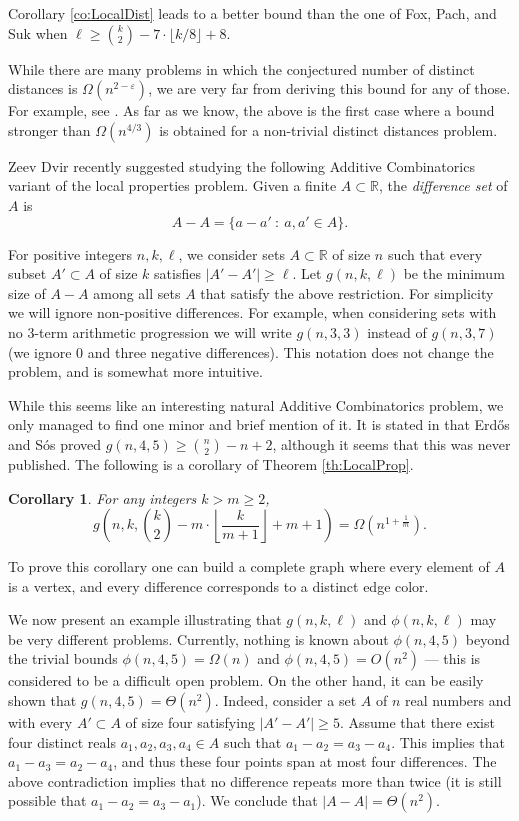 \documentclass[11pt]{article}
\newtheorem{corollary}[theorem]{Corollary}
\newcounter{problems}
\newcommand{\parag}[1]{\vspace{2mm}

\noindent{\bf #1} }
\newcommand{\RR}{\ensuremath{\mathbb R}}
\def\eps{{\varepsilon}}
\begin{document}
Corollary \ref{co:LocalDist} leads to a better bound than the one of Fox, Pach, and Suk \cite{FPS17} when $\ell \ge \binom{k}{2} - 7\cdot \lfloor k/8\rfloor + 8$.

While there are many problems in which the conjectured number of distinct distances is $\Omega(n^{2-\eps})$, we are very far from deriving this bound for any of those.
For example, see \cite{Sheffer14}.
As far as we know, the above is the first case where a bound stronger than $\Omega(n^{4/3})$ is obtained for a non-trivial distinct distances problem.

\parag{Difference sets with local properties.}
Zeev Dvir recently suggested studying the following Additive Combinatorics variant of the local properties problem.
Given a finite $A\subset \RR$, the \emph{difference set} of $A$ is
%
\[ A-A = \{a-a'\ :\ a,a'\in A \}. \]

For positive integers $n,k,\ell$, we consider sets $A\subset \RR$ of size $n$ such that every subset $A'\subset A$ of size $k$ satisfies $|A'-A'|\ge \ell$.
Let $g(n,k,\ell)$ be the minimum size of $A-A$ among all sets $A$ that satisfy the above restriction.
For simplicity we will ignore non-positive differences.
For example, when considering sets with no 3-term arithmetic progression we will write $g(n,3,3)$ instead of $g(n,3,7)$ (we ignore 0 and three negative differences).
This notation does not change the problem, and is somewhat more intuitive.

While this seems like an interesting natural Additive Combinatorics problem, we only managed to find one minor and brief mention of it.
It is stated in \cite[Section 9]{EG97} that Erd\H os and S\'os proved $g(n,4,5) \ge \binom{n}{2}-n+2$, although it seems that this was never published.
The following is a corollary of Theorem \ref{th:LocalProp}.
%
\begin{corollary}
For any integers $k > m \ge 2$,
%
\[ g\left(n,k,\binom{k}{2} - m\cdot \left\lfloor\frac{k}{m+1}\right\rfloor  + m+1 \right) = \Omega\left(n^{1+\frac{1}{m}}\right). \]
\end{corollary}
%
To prove this corollary one can build a complete graph where every element of $A$ is a vertex, and every difference corresponds to a distinct edge color.

We now present an example illustrating that $g(n,k,\ell)$ and $\phi(n,k,\ell)$ may be very different problems.
Currently, nothing is known about $\phi(n,4,5)$ beyond the trivial bounds $\phi(n,4,5)=\Omega(n)$ and $\phi(n,4,5)=O(n^2)$ --- this is considered to be a difficult open problem.
On the other hand, it can be easily shown that $g(n,4,5) = \Theta(n^2)$.
Indeed, consider a set $A$ of $n$ real numbers and with every $A' \subset A$ of size four satisfying $|A'-A'|\ge 5$.
Assume that there exist four distinct reals $a_1,a_2,a_3,a_4\in A$ such that $a_1-a_2=a_3-a_4$.
This implies that $a_1-a_3 = a_2-a_4$, and thus these four points span at most four differences.
The above contradiction implies that no difference repeats more than twice (it is still possible that $a_1-a_2 = a_3-a_1$).
We conclude that $|A-A|=\Theta(n^2)$.
\end{document}
